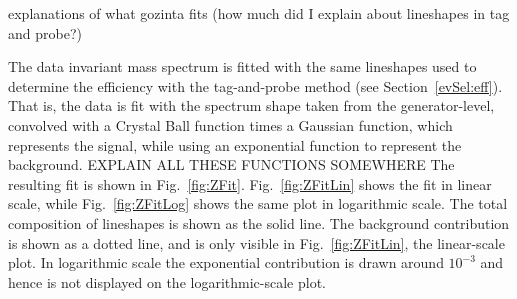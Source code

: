 explanations of what gozinta fits 
(how much did I explain 
about lineshapes in tag and probe?)

The data invariant mass spectrum is fitted with 
the same lineshapes used to determine the efficiency 
with the tag-and-probe method (see Section~\ref{evSel:eff}).  
That is, the data is fit with the \Zee spectrum 
shape taken from the generator-level, 
convolved with a Crystal Ball function 
times a Gaussian function, 
which represents the signal, 
while using an exponential function to represent 
the background.
EXPLAIN ALL THESE FUNCTIONS SOMEWHERE
The resulting fit is shown in Fig.~\ref{fig:ZFit}.  
Fig.~\ref{fig:ZFitLin} shows the fit in linear
scale, while Fig.~\ref{fig:ZFitLog} shows the
same plot in logarithmic scale.
The total composition of lineshapes is shown as the
solid line.
The background contribution is shown as a dotted line,
and is only visible in Fig.~\ref{fig:ZFitLin}, the
linear-scale plot.
In logarithmic scale the exponential contribution is
drawn around $10^{-3}$ and hence is not displayed
on the logarithmic-scale plot.


